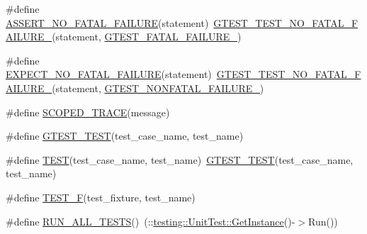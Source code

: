 \begin{DoxyCompactItemize}
\item 
\#define \hyperlink{fused-src_2gtest_2gtest_8h_a5034fda3490aad5a93942ac83f4cea49}{\-A\-S\-S\-E\-R\-T\-\_\-\-N\-O\-\_\-\-F\-A\-T\-A\-L\-\_\-\-F\-A\-I\-L\-U\-R\-E}(statement)~\hyperlink{gtest-internal_8h_a1b37a3c446836d33040f3266a6236081}{\-G\-T\-E\-S\-T\-\_\-\-T\-E\-S\-T\-\_\-\-N\-O\-\_\-\-F\-A\-T\-A\-L\-\_\-\-F\-A\-I\-L\-U\-R\-E\-\_\-}(statement, \hyperlink{gtest-internal_8h_a0f9a4c3ea82cc7bf4478eaffdc168358}{\-G\-T\-E\-S\-T\-\_\-\-F\-A\-T\-A\-L\-\_\-\-F\-A\-I\-L\-U\-R\-E\-\_\-})
\item 
\#define \hyperlink{fused-src_2gtest_2gtest_8h_a067c02ccaf3171d6e1781cd0f8cdcf74}{\-E\-X\-P\-E\-C\-T\-\_\-\-N\-O\-\_\-\-F\-A\-T\-A\-L\-\_\-\-F\-A\-I\-L\-U\-R\-E}(statement)~\hyperlink{gtest-internal_8h_a1b37a3c446836d33040f3266a6236081}{\-G\-T\-E\-S\-T\-\_\-\-T\-E\-S\-T\-\_\-\-N\-O\-\_\-\-F\-A\-T\-A\-L\-\_\-\-F\-A\-I\-L\-U\-R\-E\-\_\-}(statement, \hyperlink{gtest-internal_8h_a6cb7482cfa03661a91c698eb5895f642}{\-G\-T\-E\-S\-T\-\_\-\-N\-O\-N\-F\-A\-T\-A\-L\-\_\-\-F\-A\-I\-L\-U\-R\-E\-\_\-})
\item 
\#define \hyperlink{fused-src_2gtest_2gtest_8h_a4dac08f15adc8cb1ee0e5c1bfb0f440d}{\-S\-C\-O\-P\-E\-D\-\_\-\-T\-R\-A\-C\-E}(message)
\item 
\#define \hyperlink{fused-src_2gtest_2gtest_8h_a725b565bedc3a34dc109901854214cc4}{\-G\-T\-E\-S\-T\-\_\-\-T\-E\-S\-T}(test\-\_\-case\-\_\-name, test\-\_\-name)
\item 
\#define \hyperlink{fused-src_2gtest_2gtest_8h_ad8b332753515c0ab8baada563c2547eb}{\-T\-E\-S\-T}(test\-\_\-case\-\_\-name, test\-\_\-name)~\hyperlink{gtest__unittest_8cc_a54247aeadc0617105812dca8609638de}{\-G\-T\-E\-S\-T\-\_\-\-T\-E\-S\-T}(test\-\_\-case\-\_\-name, test\-\_\-name)
\item 
\#define \hyperlink{fused-src_2gtest_2gtest_8h_a0ee66d464d1a06c20c1929cae09d8758}{\-T\-E\-S\-T\-\_\-\-F}(test\-\_\-fixture, test\-\_\-name)
\item 
\#define \hyperlink{fused-src_2gtest_2gtest_8h_a9db43be25b176aa9a5391298e5a3718f}{\-R\-U\-N\-\_\-\-A\-L\-L\-\_\-\-T\-E\-S\-T\-S}()~(\-::\hyperlink{classtesting_1_1UnitTest_ad200090b11104aca39f25043701886cf}{testing\-::\-Unit\-Test\-::\-Get\-Instance}()-\/$>$\-Run())
\end{DoxyCompactItemize}

